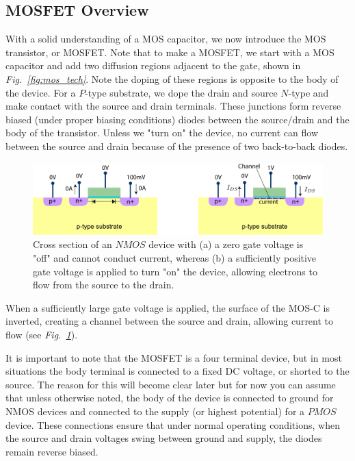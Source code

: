 \subsection{MOSFET Overview}
With a solid understanding of a MOS capacitor, we now introduce the MOS transistor, or MOSFET.  Note that to make a MOSFET, we start with a MOS capacitor and add two diffusion regions adjacent to the gate, shown in \emph{Fig.~\ref{fig:mos_tech}}.  Note the doping of these regions is opposite to the body of the device.  For a $P$-type substrate, we dope the drain and source $N$-type and make contact with the source and drain terminals.  These junctions form reverse biased (under proper biasing conditions) diodes between the source/drain and the body of the transistor.  Unless we "turn on" the device, no current can flow between the source and drain because of the presence of two back-to-back diodes.
\newpage
\begin{figure}[t]
\centering
\includegraphics[width=\columnwidth]{mostfetxsect_current} 
\caption{Cross section of an $NMOS$ device with (a) a zero gate voltage is "off" and cannot conduct current, whereas (b) a sufficiently positive gate voltage is applied to turn "on" the device, allowing electrons to flow from the source to the drain.}
\label{fig:mos_current}
\end{figure}
When a sufficiently large gate voltage is applied, the surface of the MOS-C is inverted, creating a channel between the source and drain, allowing current to flow (see \emph{Fig.~\ref{fig:mos_current}}).

It is important to note that the MOSFET is a four terminal device, but in most situations the body terminal is connected to a fixed DC voltage, or shorted to the source.  The reason for this will become clear later but for now you can assume that unless otherwise noted, the body of the device is connected to ground for NMOS devices and connected to the supply (or highest potential) for a $PMOS$ device.  These connections ensure that under normal operating conditions, when the source and drain voltages swing between ground and supply, the diodes remain reverse biased.

